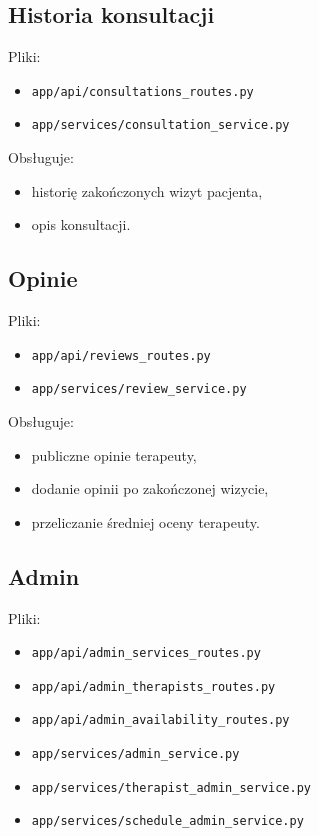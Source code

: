 \documentclass[11pt,a4paper]{article}
\begin{document}
\subsection{Historia konsultacji}
Pliki:
\begin{itemize}[leftmargin=1.2cm]
    \item \texttt{app/api/consultations\_routes.py}
    \item \texttt{app/services/consultation\_service.py}
\end{itemize}

Obsługuje:
\begin{itemize}[leftmargin=1.2cm]
    \item historię zakończonych wizyt pacjenta,
    \item opis konsultacji.
\end{itemize}

\subsection{Opinie}
Pliki:
\begin{itemize}[leftmargin=1.2cm]
    \item \texttt{app/api/reviews\_routes.py}
    \item \texttt{app/services/review\_service.py}
\end{itemize}

Obsługuje:
\begin{itemize}[leftmargin=1.2cm]
    \item publiczne opinie terapeuty,
    \item dodanie opinii po zakończonej wizycie,
    \item przeliczanie średniej oceny terapeuty.
\end{itemize}

\subsection{Admin}
Pliki:
\begin{itemize}[leftmargin=1.2cm]
    \item \texttt{app/api/admin\_services\_routes.py}
    \item \texttt{app/api/admin\_therapists\_routes.py}
    \item \texttt{app/api/admin\_availability\_routes.py}
    \item \texttt{app/services/admin\_service.py}
    \item \texttt{app/services/therapist\_admin\_service.py}
    \item \texttt{app/services/schedule\_admin\_service.py}
\end{itemize}
\end{document}

